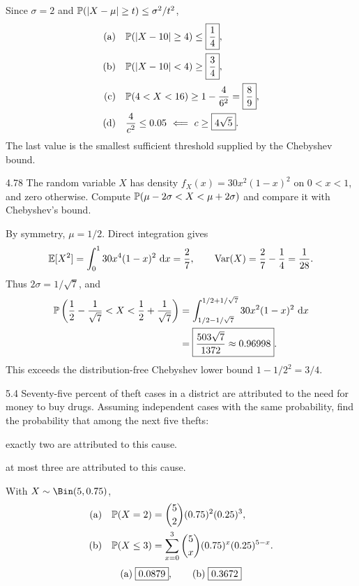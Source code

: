 \documentclass[11pt,oneside]{article}
\begin{document}
\begin{solution}
Since $\sigma=2$ and $\mathbb{P}(|X-\mu|\ge t)\le \sigma^2/t^2$,
\begin{align*}
\textup{(a)}\quad&\Prob(|X-10|\ge4)\le\boxed{\frac14},\\
\textup{(b)}\quad&\Prob(|X-10|<4)\ge\boxed{\frac34},\\
\textup{(c)}\quad&\Prob(4<X<16)\ge1-\frac4{6^2}=\boxed{\frac89},\\
\textup{(d)}\quad&\frac4{c^2}\le0.05\ \Longleftarrow\ c\ge\boxed{4\sqrt5}.
\end{align*}
The last value is the smallest sufficient threshold supplied by the Chebyshev bound.
\end{solution}

\begin{exercise}{4.78}
The random variable $X$ has density $f_X(x)=30x^2(1-x)^2$ on $0<x<1$, and zero otherwise. Compute $\mathbb{P}(\mu-2\sigma<X<\mu+2\sigma)$ and compare it with Chebyshev's bound.
\end{exercise}

\begin{solution}
By symmetry, $\mu=1/2$. Direct integration gives
\[
\mathbb{E}[X^2]=\int_0^1 30x^4(1-x)^2\,\mathop{}\!\mathrm{d} x=\frac27,
\qquad \operatorname{Var}(X)=\frac27-\frac14=\frac1{28}.
\]
Thus $2\sigma=1/\sqrt7$, and
\[
\begin{aligned}
\mathbb{P}\left(\frac12-\frac1{\sqrt7}<X<\frac12+\frac1{\sqrt7}\right)
&=\int_{1/2-1/\sqrt7}^{1/2+1/\sqrt7}30x^2(1-x)^2\,\mathop{}\!\mathrm{d} x\\
&=\boxed{\frac{503\sqrt7}{1372}\approx0.96998}.
\end{aligned}
\]
This exceeds the distribution-free Chebyshev lower bound $1-1/2^2=\boxed{3/4}$.
\end{solution}

\begin{exercise}{5.4}
Seventy-five percent of theft cases in a district are attributed to the need for money to buy drugs. Assuming independent cases with the same probability, find the probability that among the next five thefts:
\begin{exercisesubparts}
\item exactly two are attributed to this cause.
\item at most three are attributed to this cause.
\end{exercisesubparts}
\end{exercise}

\begin{solution}
With $X\sim\Bin(5,0.75)$,
\begin{align*}
\textup{(a)}\quad&\mathbb{P}(X=2)=\binom{5}{2}(0.75)^2(0.25)^3,\\
\textup{(b)}\quad&\mathbb{P}(X\le3)=\sum_{x=0}^3\binom{5}{x}(0.75)^x(0.25)^{5-x}.
\end{align*}
\[
\textup{(a)}\;\boxed{0.0879},\qquad \textup{(b)}\;\boxed{0.3672}
\]
\end{solution}
\end{document}
